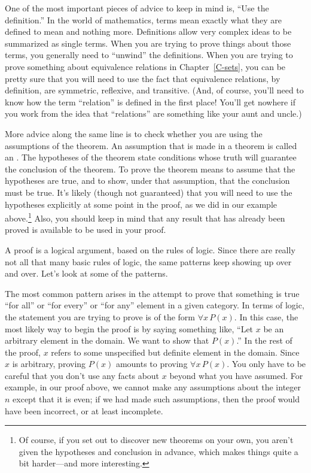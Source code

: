 One of the most important pieces of advice to keep in mind is,
``Use the definition.''  In the world of mathematics, terms
mean exactly what they are defined to mean and nothing more.
Definitions allow very complex ideas to be summarized as
single terms.  When you are trying to prove things about
those terms, you generally need to ``unwind'' the definitions.
When you are trying to prove something about equivalence relations
in Chapter~\ref{C-sets},
you can be pretty sure that you will need to use the
fact that equivalence relations, by definition, are symmetric, reflexive,
and transitive.  (And, of course,
you'll need to know how the term ``relation'' is defined
in the first place!
You'll get nowhere if you work from the idea that ``relations'' are something
like your aunt and uncle.)

More advice along the same line is to check whether you are
using the assumptions of the theorem.  An assumption that
is made in a theorem is called an .  The hypotheses
of the theorem state conditions whose truth will guarantee the
conclusion of the theorem.  To prove the theorem means to assume
that the hypotheses are true, and to show, under that assumption,
that the conclusion must be true.  It's likely (though not
guaranteed) that you will need to use the hypotheses explicitly 
at some point in the proof, as we did in our example above.\footnote{Of 
course, if you set out to
discover new theorems on your own, you aren't given the hypotheses
and conclusion in advance, which makes things quite a bit harder---and
more interesting.}  Also, you should keep in mind that any
result that has already been proved is available to be used
in your proof.

\medbreak

A proof is a logical argument, based on the rules of logic.
Since there are really not all that many basic rules of logic,
the same patterns keep showing up over and over.  Let's look
at some of the patterns.

The most common pattern arises in the attempt to prove that
something is true ``for all'' or ``for every'' or ``for any''
element in a given category.  In terms of logic, the statement
you are trying to prove is of the form $\forall x\,P(x)$.
In this case, the most likely way to begin the proof is
by saying something like, ``Let $x$ be an arbitrary element in 
the domain.  We want to show that $P(x)$.''  In the
rest of the proof, $x$ refers to some unspecified but definite
element in the domain.  Since $x$ is arbitrary,
proving $P(x)$ amounts to proving $\forall x\,P(x)$.  You only
have to be careful that you don't use any facts about $x$ beyond
what you have assumed.  For example, in our proof above, we cannot
make any assumptions about the integer $n$ except that it is
even; if we had made such assumptions, then the proof would have
been incorrect, or at least incomplete.

